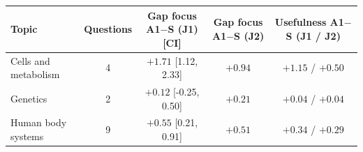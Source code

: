\begin{tabular}{lcccc}
\toprule
Topic & Questions & Gap focus A1$-$S (J1) [CI] & Gap focus A1$-$S (J2) & Usefulness A1$-$S (J1 / J2) \\
\midrule
Cells and metabolism & 4 & $+1.71$ [1.12, 2.33] & $+0.94$ & $+1.15$ / $+0.50$ \\
Genetics & 2 & $+0.12$ [-0.25, 0.50] & $+0.21$ & $+0.04$ / $+0.04$ \\
Human body systems & 9 & $+0.55$ [0.21, 0.91] & $+0.51$ & $+0.34$ / $+0.29$ \\
\bottomrule
\end{tabular}